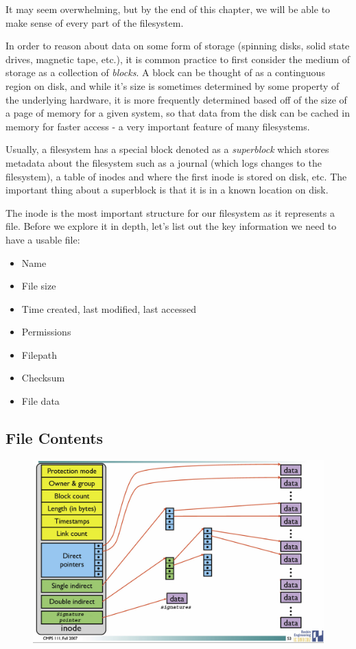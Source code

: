 It may seem overwhelming, but by the end of this chapter, we will be able to make sense of every part of the filesystem.

In order to reason about data on some form of storage (spinning disks, solid state drives, magnetic tape, etc.), it is common practice to first consider the medium of storage as a collection of \emph{blocks}. A block can be thought of as a continguous region on disk, and while it's size is sometimes determined by some property of the underlying hardware, it is more frequently determined based off of the size of a page of memory for a given system, so that data from the disk can be cached in memory for faster access - a very important feature of many filesystems.

Usually, a filesystem has a special block denoted as a \emph{superblock} which stores metadata about the filesystem such as a journal (which logs changes to the filesystem), a table of inodes and where the first inode is stored on disk, etc. The important thing about a superblock is that it is in a known location on disk.

The inode is the most important structure for our filesystem as it represents a file. Before we explore it in depth, let's list out the key information we need to have a usable file:

\begin{itemize}
\tightlist
  \item Name
  \item File size
  \item Time created, last modified, last accessed
  \item Permissions
  \item Filepath
  \item Checksum
  \item File data
\end{itemize}

\subsection{File Contents}

\begin{figure}[htbp]
\centering
\includegraphics[width=.8\textwidth]{filesystems/images/inode_with_signatures.jpg}
\caption{}
\end{figure}


